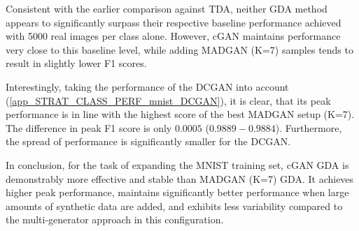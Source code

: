 Consistent with the earlier comparison against TDA, neither GDA method appears to significantly surpass their respective baseline performance achieved with 5000 real images per class alone. However, cGAN maintains performance very close to this baseline level, while adding MADGAN (K=7) samples tends to result in slightly lower F1 scores.

Interestingly, taking the performance of the DCGAN into account (\ref{app_STRAT_CLASS_PERF_mnist_DCGAN}), it is clear, that its peak performance is in line with the highest score of the best MADGAN setup (K=7). The difference in peak F1 score is only $0.0005$ ($0.9889 - 0.9884$). Furthermore, the spread of performance is significantly smaller for the DCGAN.

In conclusion, for the task of expanding the MNIST training set, cGAN GDA is demonstrably more effective and stable than MADGAN (K=7) GDA. It achieves higher peak performance, maintains significantly better performance when large amounts of synthetic data are added, and exhibits less variability compared to the multi-generator approach in this configuration.

